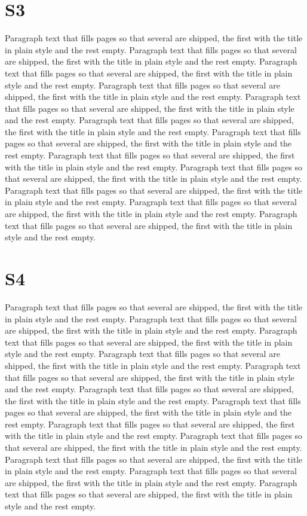 \documentclass{article}
\begin{document}
\section{S3}
Paragraph text that fills pages so that several are shipped, the first with the title in plain style and the rest empty. Paragraph text that fills pages so that several are shipped, the first with the title in plain style and the rest empty. Paragraph text that fills pages so that several are shipped, the first with the title in plain style and the rest empty. Paragraph text that fills pages so that several are shipped, the first with the title in plain style and the rest empty. Paragraph text that fills pages so that several are shipped, the first with the title in plain style and the rest empty. Paragraph text that fills pages so that several are shipped, the first with the title in plain style and the rest empty. Paragraph text that fills pages so that several are shipped, the first with the title in plain style and the rest empty. Paragraph text that fills pages so that several are shipped, the first with the title in plain style and the rest empty. Paragraph text that fills pages so that several are shipped, the first with the title in plain style and the rest empty. Paragraph text that fills pages so that several are shipped, the first with the title in plain style and the rest empty. Paragraph text that fills pages so that several are shipped, the first with the title in plain style and the rest empty. Paragraph text that fills pages so that several are shipped, the first with the title in plain style and the rest empty. 

\section{S4}
Paragraph text that fills pages so that several are shipped, the first with the title in plain style and the rest empty. Paragraph text that fills pages so that several are shipped, the first with the title in plain style and the rest empty. Paragraph text that fills pages so that several are shipped, the first with the title in plain style and the rest empty. Paragraph text that fills pages so that several are shipped, the first with the title in plain style and the rest empty. Paragraph text that fills pages so that several are shipped, the first with the title in plain style and the rest empty. Paragraph text that fills pages so that several are shipped, the first with the title in plain style and the rest empty. Paragraph text that fills pages so that several are shipped, the first with the title in plain style and the rest empty. Paragraph text that fills pages so that several are shipped, the first with the title in plain style and the rest empty. Paragraph text that fills pages so that several are shipped, the first with the title in plain style and the rest empty. Paragraph text that fills pages so that several are shipped, the first with the title in plain style and the rest empty. Paragraph text that fills pages so that several are shipped, the first with the title in plain style and the rest empty. Paragraph text that fills pages so that several are shipped, the first with the title in plain style and the rest empty. 
\end{document}
